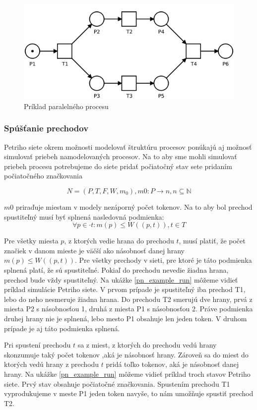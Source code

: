 \begin{figure}[!htbp]
\centering
\includegraphics[width=12cm]{img/basic_net.png}
\caption{Príklad paralelného procesu}
\label{basic_net}
\end{figure}


\subsubsection{Spúšťanie prechodov}
Petriho siete okrem možnosti modelovať štruktúru procesov ponúkajú aj možnosť simulovať priebeh namodelovaných procesov.
Na to aby sme mohli simulovať priebeh procesu potrebujeme do siete pridať počiatočný stav sete pridaním počiatočného značkovania  

\[N = (P, T, F, W, m_0 ), m0: P \rightarrow n, n \subseteq \mathbb N\]

$m0$ priraďuje miestam v modely nezáporný počet tokenov. Na to aby bol prechod spustiteľný musí byť splnená nasledovná podmienka:
\[ \forall p \in \cdot t: m(p) \leq W((p,t)), t \in T\]

Pre všetky miesta $p$, z ktorých vedie hrana do prechodu $t$, musí platiť, že počet značiek v danom mieste je väčší ako násobnosť danej hrany $ m(p) \leq W((p,t)) $. Pre všetky prechody v sieti, pre ktoré je táto podmienka splnená platí, že sú spustiteľné. Pokiaľ do prechodu nevedie žiadna hrana, prechod bude vždy spustiteľný.
Na ukážke \ref {pn_example_run} môžeme vidieť príklad simulácie Petriho siete. V prvom prípade je spustiteľný iba prechod T1, lebo do neho nesmeruje žiadna hrana. Do prechodu T2 smerujú dve hrany, prvá z miesta P2 s násobnosťou 1, druhá z miesta P1 s násobnosťou 2. Práve podmienka druhej hrany nie je splnená, lebo mesto P1 obsahuje len jeden token. V druhom prípade je aj táto podmienka splnená.
 
Pri spustení prechodu $t$ sa z miest, z ktorých do prechodu vedú hrany skonzumuje taký počet tokenov ,aká je násobnosť hrany. Zároveň sa do miest do ktorých vedú hrany z prechodu $t$ pridá toľko tokenov, aká je násobnosť danej hrany. Na ukážke \ref{pn_example_run} môžeme vidieť príklad troch stavov Petriho siete. Prvý stav obsahuje počiatočné značkovania. 
Spustením prechodu T1 vyprodukujeme v meste P1 jeden token navyše, to nám umožňuje spustiť prechod T2. 

